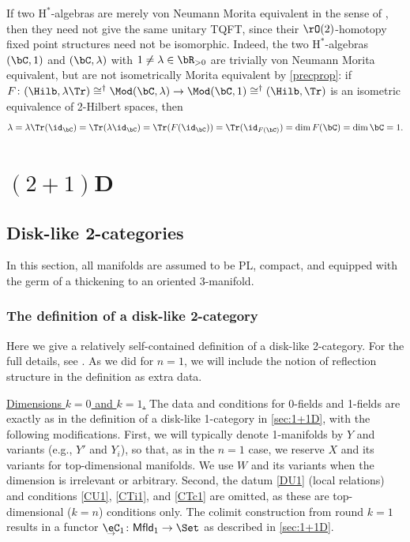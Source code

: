 \documentclass[12pt,reqno]{amsart}
\newcommand{\Mfld}{\mathsf{Mfld}}
\newcommand{\C}{\eC}
\newcommand{\Hstar}{\ensuremath{\mathrm{H}^{*}}}
\newcommand{\itemstep}[1]{\smallskip\noindent\underline{#1}}
\newcommand{\undCtemp}{\bgroup\smash[b]{\text{$\underset{\smash{\raisebox{.225em}{$\scriptstyle\kern.05ex\rightarrow$}}}{\smash{\C}}$}}\egroup}
\newcommand{\undC}{\vphantom{\C}{\undCtemp}}
\begin{document}
\begin{remark}
\label{rmk:n1failure}
  If two $\Hstar$-algebras are merely von Neumann Morita equivalent in the sense of \cite[Defn. I.3.3.9]{UQSL}, then they need not give the same unitary TQFT, since their $\rO(2)$-homotopy fixed point structures need not be isomorphic. Indeed, the two $\Hstar$-algebras $(\bC,1)$ and $(\bC,\lambda)$ with $1\neq\lambda\in\bR_{>0}$ are trivially von Neumann Morita equivalent, but are not isometrically Morita equivalent by \cref{precprop}: if $F\colon(\Hilb,\lambda\Tr)\cong^\dag\Mod(\bC,\lambda)\to\Mod(\bC,1)\cong^\dag(\Hilb,\Tr)$ is an isometric equivalence of 2-Hilbert spaces, then
  \[
    \lambda=\lambda\Tr(\id_\bC)=\Tr(\lambda\id_\bC)=\Tr(F(\id_\bC))=\Tr(\id_{F(\bC)})=\dim F(\bC)=\dim\bC=1.
  \]
\end{remark}

\section{\texorpdfstring{$(2+1)$D}{(2+1)D}}
\label{sec:2+1D}

\subsection{Disk-like 2-categories}
In this section, all manifolds are assumed to be PL, compact, and equipped with the germ of a thickening to an oriented 3-manifold.

\subsubsection{The definition of a disk-like 2-category}
\label{sec:def-dl2cat}
Here we give a relatively self-contained definition of a disk-like 2-category. For the full details, see \cite[\S6.1]{MW12}. As we did for $n=1$, we will include the notion of reflection structure in the definition as extra data.

\itemstep{Dimensions $k=0$ and $k=1$.}
The data and conditions for 0-fields and 1-fields are exactly as in the definition of a disk-like 1-category in \cref{sec:1+1D}, with the following modifications. First, we will typically denote 1-manifolds by $Y$ and variants (e.g., $Y'$ and $Y_i$), so that, as in the $n=1$ case, we reserve $X$ and its variants for top-dimensional manifolds. We use $W$ and its variants when the dimension is irrelevant or arbitrary.
Second, the datum \ref{DU1} (local relations) and conditions \ref{CU1}, \ref{CTi1}, and \ref{CTc1} are omitted, as these are top-dimensional ($k=n$) conditions only. The colimit construction from round $k=1$ results in a functor $\undC_1\colon\Mfld_1\to\Set$ as described in \cref{sec:1+1D}.
\end{document}
